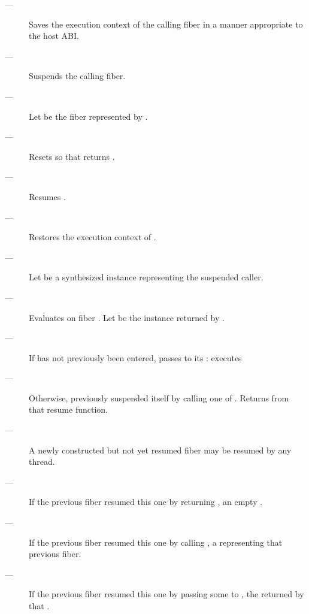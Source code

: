 \effects
\begin{description}
    \item[---] Saves the execution context of the calling fiber in a manner
               appropriate to the host ABI.
    \item[---] Suspends the calling fiber.
    \item[---] Let  be the fiber represented by .
    \item[---] Resets  so that  returns .
    \item[---] Resumes .
    \item[---] Restores the execution context of .
    \item[---] Let  be a synthesized \fiber instance representing
               the suspended caller.
    \item[---] Evaluates 
               on fiber .
               Let  be the \fiber instance returned by .
    \item[---] If  has not previously been
               entered, passes  to its \entryfn: executes\\
    \item[---] Otherwise,  previously
               suspended itself by calling one of \anyresume.
               Returns  from that resume function.
\end{description}

\remarks
\begin{description}
    \item[---] A newly constructed but not yet resumed fiber may be resumed by
              any thread.
\end{description}

\returns
\begin{description}
    \item[---] If the previous fiber resumed this one by returning \fiber,
               an empty \fiber.
    \item[---] If the previous fiber resumed this one by calling \someresume,
               a \fiber representing that previous fiber.
    \item[---] If the previous fiber resumed this one by passing some 
               to \anyresumewith, the \fiber returned by that .
\end{description}

